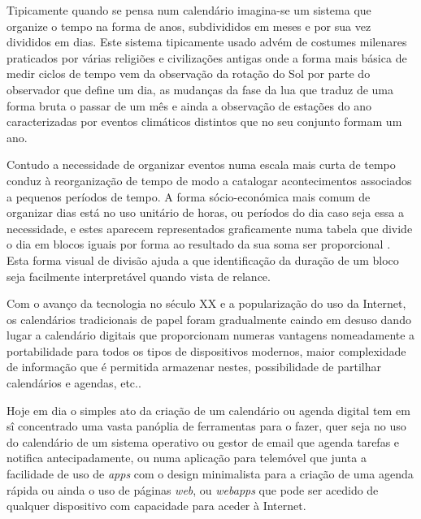 \documentclass[11pt, twoside]{report}
\begin{document}
	Tipicamente quando se pensa num calendário imagina-se um sistema que organize o tempo na forma de anos, subdivididos em meses e por sua vez divididos em dias.
	Este sistema tipicamente usado advém de costumes milenares praticados por várias religiões e civilizações antigas onde a forma mais básica de medir ciclos de tempo vem da observação da rotação do Sol por parte do observador que define um dia, as mudanças da fase da lua que traduz de uma forma bruta o passar de um mês e ainda a observação de estações do ano caracterizadas por eventos climáticos distintos que no seu conjunto formam um ano\cite{stray_mayan_2007}.
	
	Contudo a necessidade de organizar eventos numa escala mais curta de tempo conduz à reorganização de tempo de modo a catalogar acontecimentos associados a pequenos períodos de tempo. 
	A forma sócio-económica mais comum de organizar dias está no uso unitário de horas, ou períodos do dia caso seja essa a necessidade, e estes aparecem representados graficamente numa tabela\cite{10.1145/2702613.2732512} que divide o dia em blocos iguais por forma ao resultado da sua soma ser proporcional \cite{Russell1910-RUSPMV}. 
	Esta forma visual de divisão ajuda a que identificação da duração de um bloco seja facilmente interpretável quando vista de relance. 
	
	Com o avanço da tecnologia no século XX e a popularização do uso da Internet, os calendários tradicionais de papel foram gradualmente caindo em desuso dando lugar a calendário digitais que proporcionam numeras vantagens nomeadamente a portabilidade para todos os tipos de dispositivos modernos, maior complexidade de informação que é permitida armazenar nestes, possibilidade de partilhar calendários e agendas, etc.. 
	
	Hoje em dia o simples ato da criação de um calendário ou agenda digital tem em sî concentrado uma vasta panóplia de ferramentas para o fazer, quer seja no uso do calendário de um sistema operativo ou gestor de email que agenda tarefas e notifica antecipadamente, ou numa aplicação para telemóvel que junta a facilidade de uso de \textit{apps} com o design minimalista para a criação de uma agenda rápida ou ainda o uso de páginas \textit{web}, ou \textit{webapps} que pode ser acedido de qualquer dispositivo com capacidade para aceder à Internet. 
	
\end{document}
